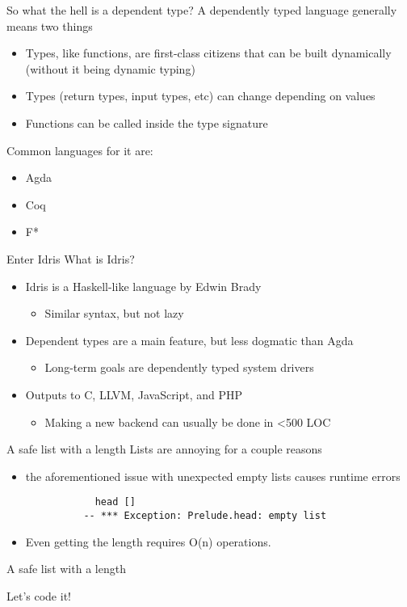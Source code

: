 \documentclass{beamer}
\begin{document}
\begin{frame}{So what the hell is a dependent type? }
 	\transdissolve
	A dependently typed language generally means two things
	\begin{itemize}	
		\item Types, like functions, are first-class citizens that can be built dynamically (without it being dynamic typing)
		\item Types (return types, input types, etc) can change depending on values
                \item Functions can be called inside the type signature
	\end{itemize}
	Common languages for it are: 

	\begin{itemize}	
		\item Agda
		\item Coq 
		\item F*
	\end{itemize}
\end{frame}
\begin{frame}{Enter Idris}
	\transdissolve
	What is Idris? 
	\begin{itemize}
		\item Idris is a Haskell-like language by Edwin Brady \begin{itemize}
				\item Similar syntax, but not lazy
	\end{itemize}
\item Dependent types are a main feature, but less dogmatic than Agda \begin{itemize}
		\item Long-term goals are dependently typed system drivers
	\end{itemize}
		\item Outputs to C, LLVM, JavaScript, and PHP \begin{itemize}
				\item Making a new backend can usually be done in \textless 500 LOC
			\end{itemize}
	\end{itemize}
\end{frame}
\begin{frame}[fragile]{A safe list with a length}
	\transdissolve
	Lists are annoying for a couple reasons
	\begin{itemize}
		\item the aforementioned issue with unexpected empty lists causes runtime errors
		\begin{lstlisting} 
			head [] 
		  -- *** Exception: Prelude.head: empty list
		\end{lstlisting}
	\item Even getting the length requires O(n) operations.
	\end{itemize}
	
\end{frame}
\begin{frame}[fragile]{A safe list with a length}
	\transdissolve
	\begin{center} 
		Let's code it!
	\end{center}
\end{frame}
\end{document}
